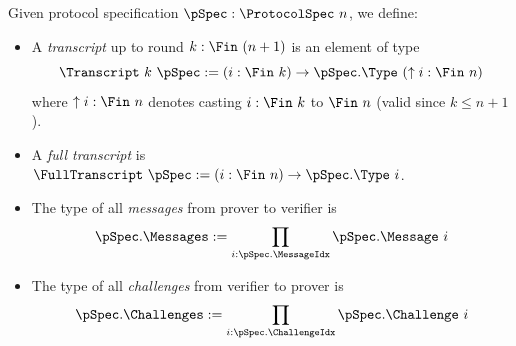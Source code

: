 \begin{definition}
    \label{def:transcript}
        Given protocol specification \(\pSpec : \ProtocolSpec\ n\), we define:
    \begin{itemize}
        \item A \emph{transcript} up to round \(k : \Fin\ (n + 1)\) is an element of type
                \begin{equation*} \Transcript\ k\ \pSpec := (i : \Fin\ k) \to \pSpec.\Type\ (\uparrow i : \Fin\ n) \end{equation*}
        where \(\uparrow i : \Fin\ n\) denotes casting \(i : \Fin\ k\) to \(\Fin\ n\) (valid since \(k \leq n + 1\)).

        \item A \emph{full transcript} is \(\FullTranscript\ \pSpec := (i : \Fin\ n) \to \pSpec.\Type\ i\).

        \item The type of all \emph{messages} from prover to verifier is
        \begin{equation*} \pSpec.\Messages := \prod_{i : \pSpec.\MessageIdx} \pSpec.\Message\ i \end{equation*}

        \item The type of all \emph{challenges} from verifier to prover is
        \begin{equation*} \pSpec.\Challenges := \prod_{i : \pSpec.\ChallengeIdx} \pSpec.\Challenge\ i \end{equation*}
    \end{itemize}
    \leanok
\end{definition}


